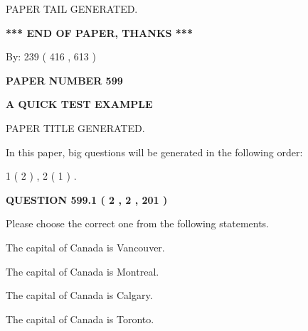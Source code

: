 \documentclass[12pt]{article}
\begin{document}
   
   
   
   
   
 \vspace{0.2in}
 
   
   
\vspace{2.0in} PAPER TAIL GENERATED.
   
   
   
   
\vspace{1.0in} 
{\textbf{\large{ *** END OF PAPER, THANKS *** }}} 
   
   
\hspace{1.0in} By: 
 239 ( 416 ,  613 )
   
   
   
   
\newpage 
\setcounter{page}{ 
   599001 } 
   
   
   
   
 {\textbf{ \Large{ PAPER NUMBER  599  }}}
   
   
\vspace{0.2in}
   
   
   
   
   
   
   
   
 \vspace{0.2in}
{\LARGE {\textbf{ A QUICK TEST EXAMPLE}}}
   
   
 PAPER TITLE GENERATED.
   
   
   
\vspace{0.2in}
   
In this paper, big questions will be generated in the following order: 
   
   
   1 ( 2 )
 ,
   2 ( 1 )
 .
  
\vspace{0.2in}
  
{\textbf{\Large{QUESTION
599.1 
 ( 2 , 2 , 201 )
}}}
  
  
Please choose the correct one from the following statements.
 
 
The capital of Canada is Vancouver.
 
 
The capital of Canada is Montreal.
 
 
The capital of Canada is Calgary.
 
 
The capital of Canada is Toronto.
 
\end{document}
